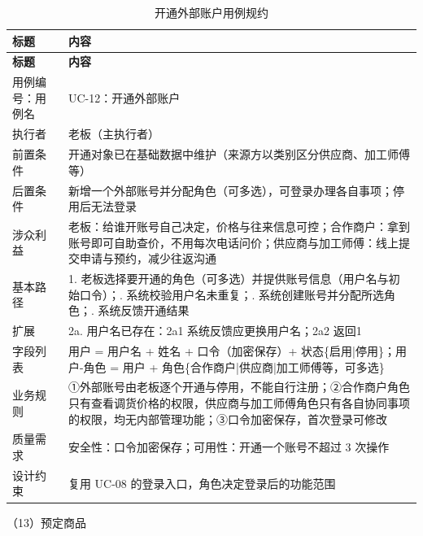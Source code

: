 \documentclass[12pt, a4paper]{ctexart}
\begin{document}
{\small
\begin{longtable}{@{}p{2.4cm} p{12.9cm}@{}}
\caption{开通外部账户用例规约}\label{tab:uc-12}\\
\toprule
\textbf{标题} & \textbf{内容} \\
\midrule
\endfirsthead
\toprule
\textbf{标题} & \textbf{内容} \\
\midrule
\endhead
用例编号：用例名 & UC-12：开通外部账户 \\
\midrule
执行者 & 老板（主执行者） \\
\midrule
前置条件 & 开通对象已在基础数据中维护（来源方以类别区分供应商、加工师傅等） \\
\midrule
后置条件 & 新增一个外部账号并分配角色（可多选），可登录办理各自事项；停用后无法登录 \\
\midrule
涉众利益 & 老板：给谁开账号自己决定，价格与往来信息可控；\newline 合作商户：拿到账号即可自助查价，不用每次电话问价；\newline 供应商与加工师傅：线上提交申请与预约，减少往返沟通 \\
\midrule
基本路径 & 1. 老板选择要开通的角色（可多选）并提供账号信息（用户名与初始口令）；\newline 2. 系统校验用户名未重复；\newline 3. 系统创建账号并分配所选角色；\newline 4. 系统反馈开通结果 \\
\midrule
扩展 & 2a. 用户名已存在：2a1 系统反馈应更换用户名；2a2 返回1 \\
\midrule
字段列表 & 用户 = 用户名 + 姓名 + 口令（加密保存）+ 状态\{启用|停用\}；\newline 用户-角色 = 用户 + 角色\{合作商户|供应商|加工师傅等，可多选\} \\
\midrule
业务规则 & ①外部账号由老板逐个开通与停用，不能自行注册；\newline ②合作商户角色只有查看调货价格的权限，供应商与加工师傅角色只有各自协同事项的权限，均无内部管理功能；\newline ③口令加密保存，首次登录可修改 \\
\midrule
质量需求 & 安全性：口令加密保存；\newline 可用性：开通一个账号不超过 3 次操作 \\
\midrule
设计约束 & 复用 UC-08 的登录入口，角色决定登录后的功能范围 \\
\midrule
\bottomrule
\end{longtable}}
\noindent（13）预定商品
\end{document}

